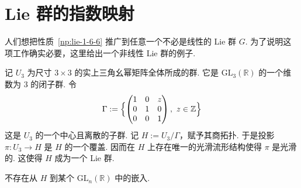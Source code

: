\section{Lie 群的指数映射}\label{sec:lie-1-7}

人们想把性质~\ref{np:lie-1-6-6} 推广到任意一个不必是线性的 Lie 群 $G$. 为了说明这项工作确实必要，这里给出一个非线性 Lie 群的例子.

\begin{numpara}\label{np:lie-1-7-1}
记 $U_{3}$ 为尺寸 $3\times 3$ 的实上三角幺幂矩阵全体所成的群. 它是 $\mathrm{GL}_{3}(\mathbb R)$ 的一个维数为 $3$ 的闭子群. 令
\[
\Gamma:=\Bigl\{\begin{pmatrix}1&0&z\\0&1&0\\0&0&1\end{pmatrix},\ z\in\mathbb Z\Bigr\}
\]
这是 $U_{3}$ 的一个中心且离散的子群. 记 $H:=U_{3}/\Gamma$，赋予其商拓扑. 于是投影 $\pi:U_{3}\longrightarrow H$ 是 $H$ 的一个覆盖. 因而在 $H$ 上存在唯一的光滑流形结构使得 $\pi$ 是光滑的. 这使得 $H$ 成为一个 Lie 群.
\end{numpara}

\begin{proposition*}
不存在从 $H$ 到某个 $\mathrm{GL}_{n}(\mathbb R)$ 中的嵌入.
\end{proposition*}

